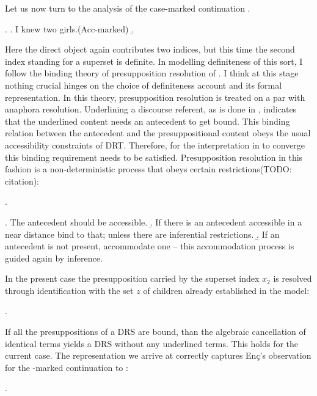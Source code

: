 \documentclass[11pt,a4paper]{article}
\begin{document}
Let us now turn to the analysis of the case-marked continuation
.

\ex.\label{exencacc1}
\a. I knew two girls.\hfill (Acc-marked)
\b. 

Here the direct object  again contributes two
indices, but this time the second index standing for a superset is definite. In
modelling definiteness of this sort, I follow the binding theory of
presupposition resolution of . I think at this stage nothing
crucial hinges on the choice of definiteness account and its formal
representation. In this theory, presupposition resolution is treated on a par
with anaphora resolution. Underlining a discourse referent, as is done in
, indicates that the underlined content needs an antecedent to
get bound. This binding relation between the antecedent and the
presuppositional content obeys the usual accessibility constraints of DRT.
Therefore, for the interpretation in  to converge this binding
requirement needs to be satisfied. Presupposition resolution in this fashion is
a non-deterministic process that obeys certain restrictions(TODO:
citation):

\ex.

\a. The antecedent should be accessible.
\b. If there is an antecedent accessible in a near distance bind to
that; unless there are inferential restrictions.
\b. If an antecedent is not present, accommodate one -- this
accommodation process is guided again by inference.

In the present case the presupposition carried by the superset index $x_2$ is
resolved through identification with the set $z$ of children already
established in the model:

\ex.


If all the presuppositions of a DRS are bound, than the algebraic cancellation of identical terms yields a DRS without any underlined terms. This holds for the current case. The representation we arrive at correctly captures Enç's observation for the \acc-marked continuation to :

\ex.
\end{document}
